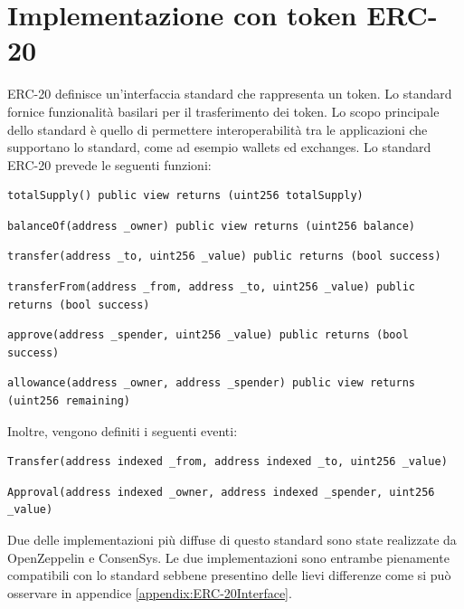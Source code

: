 \section{Implementazione con token ERC-20}
ERC-20 definisce un'interfaccia standard che rappresenta un token. Lo standard fornice funzionalità basilari per il trasferimento dei token. Lo scopo principale dello standard è quello di permettere interoperabilità tra le applicazioni che supportano lo standard, come ad esempio wallets ed exchanges. 
Lo standard ERC-20 prevede le seguenti funzioni:
\begin{lstlisting}[language=Solidity,numbers=none]
totalSupply() public view returns (uint256 totalSupply)
\end{lstlisting} 
\begin{lstlisting}[language=Solidity,numbers=none]
balanceOf(address _owner) public view returns (uint256 balance)\end{lstlisting}
\begin{lstlisting}[language=Solidity,numbers=none] 
transfer(address _to, uint256 _value) public returns (bool success)\end{lstlisting} 
\begin{lstlisting}[language=Solidity,numbers=none]
transferFrom(address _from, address _to, uint256 _value) public returns (bool success)
\end{lstlisting}
\begin{lstlisting}[language=Solidity,numbers=none]
approve(address _spender, uint256 _value) public returns (bool success)
\end{lstlisting}
\begin{lstlisting}[language=Solidity,numbers=none]
allowance(address _owner, address _spender) public view returns (uint256 remaining)
\end{lstlisting}
Inoltre, vengono definiti i seguenti eventi:
\begin{lstlisting}[language=Solidity,numbers=none]
Transfer(address indexed _from, address indexed _to, uint256 _value)
\end{lstlisting}
\begin{lstlisting}[language=Solidity,numbers=none]
Approval(address indexed _owner, address indexed _spender, uint256 _value)
\end{lstlisting}
Due delle implementazioni più diffuse di questo standard sono state realizzate da OpenZeppelin e ConsenSys. Le due implementazioni sono entrambe pienamente compatibili con lo standard sebbene presentino delle lievi differenze come si può osservare in appendice \ref{appendix:ERC-20Interface}.

